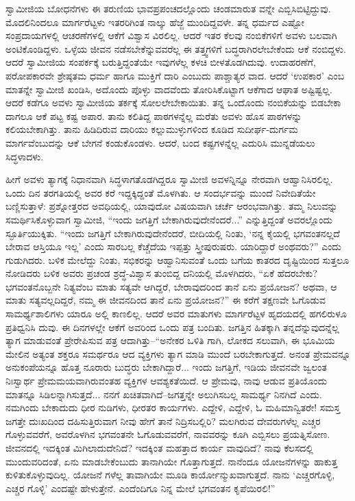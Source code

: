 ಸ್ವಾಮೀಜಿಯ ಬೋಧನೆಗಳು ಈ ತರುಣಿಯ ಭಾವಪ್ರಪಂಚದಲ್ಲೊಂದು ಚಂಡಮಾರುತ ವನ್ನೇ ಎಬ್ಬಿಸಿಬಿಟ್ಟಿದ್ದುವು. ಮೊದಲಿನಿಂದಲೂ ಮಾರ್ಗರೆಟ್ಟಳು ಇತರರಿಗಿಂತ ನಾಲ್ಕು ಹೆಜ್ಜೆ ಮುಂದಿದ್ದವಳೇ. ತನ್ನ ಧರ್ಮದ ಎಷ್ಟೋ ಸಂಪ್ರದಾಯಗಳಲ್ಲಿ ಆಚರಣೆಗಳಲ್ಲಿ ಆಕೆಗೆ ವಿಶ್ವಾಸ ವಿರಲಿಲ್ಲ. ಆದರೆ ಇತರ ಕೆಲವು ನಂಬಿಕೆಗಳಿಗೆ ಅವಳು ಬಲವಾಗಿ ಅಂಟಿಕೊಂಡಿದ್ದಳು. ಒಳ್ಳೆಯ ಜೀವನ ನಡೆಸಬೇಕೆನ್ನುವವರೆಲ್ಲ ಈ ತತ್ತ್ವಗಳಿಗೆ ಬದ್ಧರಾಗಿರಲೇಬೇಕೆಂದು ಆಕೆ ನಂಬಿದ್ದಳು. ಆದರೆ ಸ್ವಾಮೀಜಿಯ ಸಂಪರ್ಕಕ್ಕೆ ಬರುತ್ತಿದ್ದಂತೆಯೇ ಇವುಗಳೆಲ್ಲ ಕಳಚಿ ಬೀಳತೊಡಗಿದುವು. ಉದಾಹರಣೆಗೆ, ಪರೋಪಕಾರವೇ ಶ್ರೇಷ್ಠತಮ ಧರ್ಮ ಹಾಗೂ ಮುಕ್ತಿಗೆ ದಾರಿ ಎಂಬುದು ಪಾಶ್ಚಾತ್ಯರ ವಾದ. ಆದರೆ ‘ಉಪಕಾರ’ ಎಂಬ ಮಾತನ್ನೇ ಸ್ವಾಮೀಜಿ ಖಂಡಿಸಿ, ಅದೊಂದು ಪೊಳ್ಳು ವಾದವೆಂದು ತೋರಿಸಿಕೊಟ್ಟಾಗ ಆಕೆಗಾದ ಆಘಾತ ಅಷ್ಟಿಷ್ಟಲ್ಲ. ಆದರೆ ಕಡೆಗೂ ಅವಳು ಸ್ವಾಮೀಜಿಯ ತರ್ಕಕ್ಕೆ ಸೋಲಲೇಬೇಕಾಯಿತು. ತನ್ನ ಒಂದೊಂದು ನಂಬಿಕೆಯನ್ನು ಬಿಡಬೇಕಾ ದಾಗಲೂ ಆಕೆ ಪಟ್ಟ ಕಷ್ಟ ಅಪಾರ. ತಾನು ಕಲಿತಿದ್ದ ಪಾಠಗಳನ್ನೆಲ್ಲ ಮರೆತು ಅವಳು ಹೊಸ ಪಾಠಗಳನ್ನು ಕಲಿಯಬೇಕಾಗಿತ್ತು. ತಾನು ಹಿಡಿದಿರುವ ದಾರಿಯು ಕಲ್ಲುಮುಳ್ಳುಗಳಿಂದ ಕೂಡಿದ ಸುದೀರ್ಘ-ದುರ್ಗಮ ಮಾರ್ಗವೆಂಬುದನ್ನು ಆಕೆ ಬೇಗನೆ ಕಂಡುಕೊಂಡಳು. ಆದರೆ, ಬಂದ ಕಷ್ಟಗಳನ್ನೆಲ್ಲ ಎದುರಿಸಿ ಮುನ್ನಡೆಯಲು ಸಿದ್ಧಳಾದಳು.

ಹೀಗೆ ಅವಳು ತ್ಯಾಗಕ್ಕೆ ನಿಧಾನವಾಗಿ ಸಿದ್ಧಳಾಗತೊಡಗಿದ್ದರೂ ಸ್ವಾಮೀಜಿ ಅವಳನ್ನಿನ್ನೂ ನೇರವಾಗಿ ಆಹ್ವಾನಿಸಿರಲಿಲ್ಲ. ಒಂದು ದಿನ ತರಗತಿಯಲ್ಲಿ ಅವರ ಕರೆ ಇದ್ದಕ್ಕಿದ್ದಂತೆ ಮೊಳಗಿತು. ಆ ಸಂದರ್ಭವನ್ನು ಮುಂದೆ ನಿವೇದಿತೆಯೇ ಬಣ್ಣಿಸುತ್ತಾಳೆ: ಪ್ರಶ್ನೋತ್ತರದ ಅವಧಿಯಲ್ಲಿ, ಯಾವುದೋ ವಿಷಯವಾಗಿ ಚರ್ಚೆ ಆರಂಭವಾಗಿತ್ತು. ತಮ್ಮ ನಿಲುವನ್ನು ಸಮರ್ಥಿಸಿಕೊಳ್ಳುವಾಗ ಸ್ವಾಮೀಜಿ, “ಇಂದು ಜಗತ್ತಿಗೆ ಬೇಕಾಗಿರುವುದೇನೆಂದರೆ...” ಎನ್ನುತ್ತಿದ್ದಂತೆ ಅವರಲ್ಲೊಂದು ಸ್ಫೂರ್ತಿಯುಕ್ಕಿತು. “ಇಂದು ಜಗತ್ತಿಗೆ ಬೇಕಾಗಿರುವುದೇನೆಂದರೆ, ಬೀದಿಯಲ್ಲಿ ನಿಂತು, ‘ನನ್ನ ಕೈಯಲ್ಲಿ ಭಗವಂತನಲ್ಲದೆ ಬೇರಾವ ಆಸ್ತಿಯೂ ಇಲ್ಲ’ ಎಂದು ಸಾರಬಲ್ಲ ಕೆಚ್ಚೆದೆಯ ಇಪ್ಪತ್ತು ಸ್ತ್ರೀಪುರುಷರು. ಯಾರಿದ್ದಾರೆ ಅಂಥವರು?” ಎಂದು ಗುಡುಗಿದರು. ಬಳಿಕ ಮೇಲೆದ್ದು ನಿಂತು, ಸಭಿಕರನ್ನು ಆಹ್ವಾನಿಸುವಂತೆ ಒಂದು ಬಗೆಯ ಕಾತರದ ದೃಷ್ಟಿಯಿಂದ ಸುತ್ತಲೂ ನೋಡಿದರು ಬಳಿಕ ಅವರು ಪ್ರಚಂಡ ಶ್ರದ್ಧೆ-ವಿಶ್ವಾಸ ತುಂಬಿದ್ದ ದನಿಯಲ್ಲಿ ಮೊಳಗಿದರು, “ಏಕೆ ಹೆದರಬೇಕು? ಭಗವಂತನೊಬ್ಬನೇ ನಿತ್ಯವೆಂಬ ಮಾತು ಸತ್ಯವೇ ಆಗಿದ್ದರೆ, ಬೇರಾವುದರಿಂದ ತಾನೆ ಏನು ಪ್ರಯೋಜನ? ಅಥವಾ, ಆ ಮಾತು ಸತ್ಯವಲ್ಲದಿದ್ದರೆ, ನಮ್ಮ ಈ ಜೀವನದಿಂದ ತಾನೆ ಏನು ಪ್ರಯೋಜನ?” ಈ ಕರೆಗೆ ತಕ್ಷಣವೇ ಓಗೊಡುವ ಸಾಮರ್ಥ್ಯಶಾಲಿಗಳು ಯಾರೂ ಅಲ್ಲಿ ಕಾಣಲಿಲ್ಲ. ಆದರೆ ಅವರ ಮಾತುಗಳು ಮಾರ್ಗರೆಟ್ಟಳ ಹೃದಯದಲ್ಲಿ ಹಗಲಿರುಳೂ ಪ್ರತಿಧ್ವನಿಸಿ ದುವು. ಈ ದಿನಗಳಲ್ಲೇ ಆಕೆಗೆ ಅವರಿಂದ ಒಂದು ಪತ್ರ ಬಂದಿತು. ಜಗತ್ತಿನ ಹಿತಕ್ಕಾಗಿ ತನ್ನದೆನ್ನುವುದನ್ನೆಲ್ಲ ತ್ಯಾಗ ಮಾಡುವಂತೆ ಪ್ರೇರೇಪಿಸುವ ಪತ್ರ ಆದಾಗಿತ್ತು–“ಅನೇಕರ ಒಳಿತಿ ಗಾಗಿ, ಲೋಕದ ಸಲುವಾಗಿ, ಈ ಭೂಮಿಯ ಮೇಲಿನ ಅತ್ಯಂತ ಶಕ್ತರೂ ಸಮರ್ಥರೂ ಆದ ವ್ಯಕ್ತಿಗಳು ತ್ಯಾಗ ಮಾಡಿ ಮುಂದೆ ಬರಬೇಕಾಗುತ್ತದೆ. ಅನಂತ ಪ್ರೇಮವನ್ನೂ ಅನುಕಂಪೆಯನ್ನೂ ಹೊತ್ತ ನೂರಾರು ಬುದ್ಧರು ಬೇಕಾಗಿದ್ದಾರೆ... ಇಂದು ಜಗತ್ತಿಗೆ, ಇಡಿಯ ಜೀವನವೇ ಜ್ವಲಂತ ನಿಃಸ್ವಾರ್ಥ ಪ್ರೇಮಮಯವಾಗಿರುವಂತಹ ವ್ಯಕ್ತಿಗಳ ಆವಶ್ಯಕತೆಯಿದೆ. ಆ ಪ್ರೇಮವು, ನಾವು ಆಡುವ ಪ್ರತಿಯೊಂದು ಮಾತನ್ನೂ ಸಿಡಿಲನ್ನಾಗಿಸುತ್ತದೆ... ನನಗೆ ಖಚಿತವಾಗಿದೆ–ಜಗತ್ತನ್ನೇ ಅಲುಗಿಸಬಲ್ಲ ಸಾಮರ್ಥ್ಯ ನಿನಗಿದೆ ಎಂದು. ನಮಗಿಂದು ಬೇಕಾದುದು ಧೀರ ನುಡಿಗಳು, ಧೀರತರ ಕಾರ್ಯಗಳು. ಎದ್ದೇಳಿ, ಎದ್ದೇಳಿ, ಓ ಮಹಿಮಾನ್ವಿತರೇ! ಸಮಸ್ತ ಜಗತ್ತೇ ದುಃಖದಿಂದ ದಹಿಸುತ್ತಿರುವಾಗ ನೀವು ಹೇಗೆ ತಾನೆ ನಿದ್ರಿಸಬಲ್ಲಿರಿ? ಮಲಗಿರುವ ದೇವರುಗಳೆಲ್ಲ ಎಚ್ಚರ ಗೊಳ್ಳುವವರೆಗೆ, ಅವರೊಳಗಿನ ಭಗವಂತನೇ ಓಗೊಡುವವರೆಗೆ, ನಾವವರನ್ನು ಕೂಗಿ ಎಬ್ಬಿಸಲು ಪ್ರಯತ್ನಿಸೋಣ. ಜೀವನದಲ್ಲಿ ಇದಕ್ಕಿಂತ ಮಿಗಿಲಾದುದೇನಿದೆ? ಇದಕ್ಕಿಂತ ಮಹತ್ತಾದ ಕಾರ್ಯ ವಾವುದಿದೆ? ನಾವು ಕೆಲಸದಲ್ಲಿ ಮುಂದುವರಿದಂತೆ, ಏನು ಮಾಡಬೇಕೆಂಬುದು ತಾನಾಗಿಯೇ ಗೊತ್ತಾಗುತ್ತದೆ. ನಾನೆಂದೂ ಯೋಜನೆಗಳನ್ನು ಹಾಕುತ್ತ ಕುಳಿತುಕೊಳ್ಳುವುದಿಲ್ಲ. ಯೋಜನೆ ಗಳೆಲ್ಲ ತಾವಾಗಿಯೇ ಮೂಡಿ ಕಾರ್ಯೋನ್ಮುಖವಾಗುತ್ತದೆ. ನಾನು ‘ಎಚ್ಚರಗೊಳ್ಳಿ, ಎಚ್ಚರ ಗೊಳ್ಳಿ’ ಎಂದಷ್ಟೇ ಹೇಳುತ್ತೇನೆ. ಎಂದೆಂದಿಗೂ ನಿನ್ನ ಮೇಲೆ ಭಗವಂತನ ಕೃಪೆಯಿರಲಿ!”

